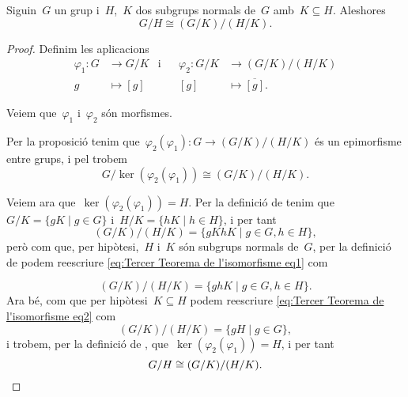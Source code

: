 \documentclass[../../main.tex]{subfiles}
\begin{document}
    \begin{theorem}
        \label{thm:Tercer Teorema de l'isomorfisme entre grups}
        Siguin~\(G\) un grup i~\(H\),~\(K\) dos subgrups normals de~\(G\) amb~\(K\subseteq H\).
        Aleshores
        \[
            G/H\cong (G/K)/(H/K).
        \]
    \end{theorem}
    \begin{proof}
        Definim les aplicacions
        \begin{align*}
        \varphi_{1}\colon G&\longrightarrow G/K&\text{i}&&\varphi_{2}\colon G/K&\longrightarrow(G/K)/(H/K)\\
        g&\longmapsto[g]&&&[g]&\longmapsto\overline{[g]}.
        \end{align*}

        Veiem que~\(\varphi_{1}\) i~\(\varphi_{2}\) són morfismes.

        Per la proposició  tenim que~\(\varphi_{2}(\varphi_{1})\colon G\longrightarrow(G/K)/(H/K)\) és un epimorfisme entre grups, %
        i pel  trobem
        \[
            G/\ker(\varphi_{2}(\varphi_{1}))\cong(G/K)/(H/K).
        \]

        Veiem ara que~\(\ker(\varphi_{2}(\varphi_{1}))=H\).
        Per la definició de  tenim que~\(G/K=\{gK\mid g\in G\}\) i~\(H/K=\{hK\mid h\in H\}\), i per tant
        \begin{equation}
        \label{eq:Tercer Teorema de l'isomorfisme eq1}
        (G/K)/(H/K)=\{gKhK\mid g\in G, h\in H\},
        \end{equation}
        però com que, per hipòtesi,~\(H\) i~\(K\) són subgrups normals de~\(G\), per la definició de  podem reescriure \eqref{eq:Tercer Teorema de l'isomorfisme eq1} com

        \begin{equation}\label{eq:Tercer Teorema de l'isomorfisme eq2}
        (G/K)/(H/K)=\{ghK\mid g\in G,h\in H\}.
        \end{equation}
        Ara bé, com que per hipòtesi~\(K\subseteq H\) podem reescriure \eqref{eq:Tercer Teorema de l'isomorfisme eq2} com
        \[
            (G/K)/(H/K)=\{gH\mid g\in G\},
        \]
        i trobem, per la definició de , que~\(\ker(\varphi_{2}(\varphi_{1}))=H\), i per tant
        \[
            G/H\cong (G/K)/(H/K).\qedhere
        \]
    \end{proof}
\end{document}
